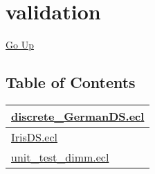 \chapter*{\color{headtoc} validation}
\hypertarget{ecldoc:toc:root/validation}{}
\hyperlink{ecldoc:toc:}{Go Up}


\section*{Table of Contents}
{\renewcommand{\arraystretch}{1.5}
\begin{longtable}{|p{\textwidth}|}
\hline
\hyperlink{ecldoc:toc:validation.discrete_GermanDS}{discrete\_GermanDS.ecl} \\
\hline
\hyperlink{ecldoc:toc:validation.IrisDS}{IrisDS.ecl} \\
\hline
\hyperlink{ecldoc:toc:validation.unit_test_dimm}{unit\_test\_dimm.ecl} \\
\hline
\end{longtable}
}




